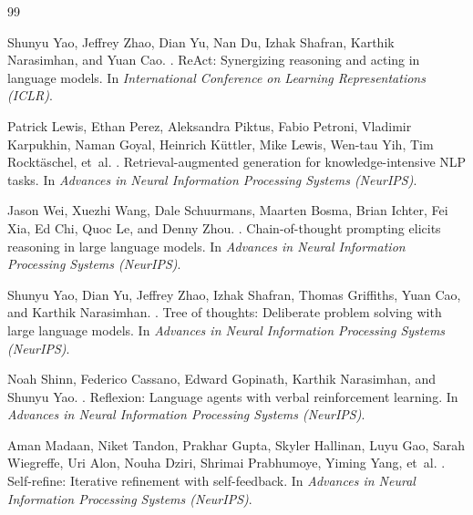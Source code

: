 \begin{thebibliography}{99}

Shunyu Yao, Jeffrey Zhao, Dian Yu, Nan Du, Izhak Shafran, Karthik
Narasimhan, and Yuan Cao.
.
\newblock ReAct: Synergizing reasoning and acting in language models.
\newblock In \emph{International Conference on Learning Representations
(ICLR)}.

Patrick Lewis, Ethan Perez, Aleksandra Piktus, Fabio Petroni, Vladimir
Karpukhin, Naman Goyal, Heinrich K{\"u}ttler, Mike Lewis, Wen-tau Yih,
Tim Rockt{\"a}schel, et~al.
.
\newblock Retrieval-augmented generation for knowledge-intensive NLP tasks.
\newblock In \emph{Advances in Neural Information Processing Systems
(NeurIPS)}.

Jason Wei, Xuezhi Wang, Dale Schuurmans, Maarten Bosma, Brian Ichter, Fei
Xia, Ed Chi, Quoc Le, and Denny Zhou.
.
\newblock Chain-of-thought prompting elicits reasoning in large language
models.
\newblock In \emph{Advances in Neural Information Processing Systems
(NeurIPS)}.

Shunyu Yao, Dian Yu, Jeffrey Zhao, Izhak Shafran, Thomas Griffiths, Yuan
Cao, and Karthik Narasimhan.
.
\newblock Tree of thoughts: Deliberate problem solving with large language
models.
\newblock In \emph{Advances in Neural Information Processing Systems
(NeurIPS)}.

Noah Shinn, Federico Cassano, Edward Gopinath, Karthik Narasimhan, and
Shunyu Yao.
.
\newblock Reflexion: Language agents with verbal reinforcement learning.
\newblock In \emph{Advances in Neural Information Processing Systems
(NeurIPS)}.

Aman Madaan, Niket Tandon, Prakhar Gupta, Skyler Hallinan, Luyu Gao,
Sarah Wiegreffe, Uri Alon, Nouha Dziri, Shrimai Prabhumoye, Yiming Yang,
et~al.
.
\newblock Self-refine: Iterative refinement with self-feedback.
\newblock In \emph{Advances in Neural Information Processing Systems
(NeurIPS)}.


\end{thebibliography}
